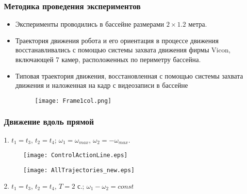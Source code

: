 %
%



\begin{frame}
\frametitle{Методика проведения экспериментов}

	\begin{itemize}
		\item Эксперименты проводились в бассейне размерами $2 \times 1.2$ метра. 
		\item Траектория движения робота и его ориентация в процессе движения восстанавливались с помощью системы захвата движения фирмы Vicon, включающей 7 камер, расположенных по периметру бассейна. 
		\item Типовая траектория движения, восстановленная с помощью системы захвата движения и наложенная на кадр с видеозаписи в бассейне
		
		\begin{figure}[!h]
			\centering
			\texttt{[image: Frame1col.png]}
		\end{figure}
	\end{itemize}



\end{frame}


\begin{frame}
\frametitle{Движение вдоль прямой}

1. $t_1=t_3$, $ t_2 = t_4$; \quad $ \omega_1 = \omega_{max} $, $ \omega_2 = -\omega_{max} $.

\begin{minipage}[t]{0.3\linewidth}
	\begin{figure}[!ht]
		\centering
		\texttt{[image: ControlActionLine.eps]}
	\end{figure}	
\end{minipage}
\hfill
\begin{minipage}[t]{0.68\linewidth}
	\begin{figure}[!ht]
		\centering
		\texttt{[image: AllTrajectories\_new.eps]}
	\end{figure}
\end{minipage}	
	
2. 	$t_1=t_3$, $ t_2 = t_4$, $ T=2 $ с.; \quad $ \omega_1 - \omega_2 = const$

\begin{minipage}[h]{0.47\linewidth}
\end{minipage}
\hfill
\begin{minipage}[h]{0.47\linewidth}
\end{minipage}


\end{frame}



